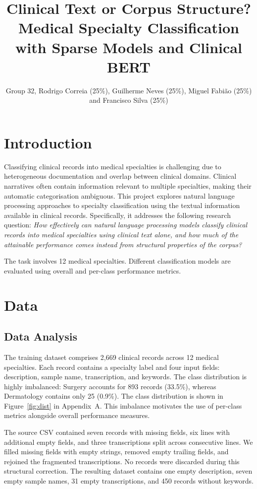 \documentclass[twocolumn,10pt]{article}
\title{Clinical Text or Corpus Structure? Medical Specialty Classification with Sparse Models and Clinical BERT}
\author{Group 32, Rodrigo Correia (25\%), Guilherme Neves (25\%), Miguel Fabião (25\%) and Francisco Silva (25\%)}
\date{}
\begin{document}
\maketitle

\raggedbottom

\section{Introduction}

\noindent
Classifying clinical records into medical specialties is challenging due to heterogeneous documentation and overlap between clinical domains. Clinical narratives often contain information relevant to multiple specialties, making their automatic categorisation ambiguous. This project explores natural language processing approaches to specialty classification using the textual information available in clinical records. Specifically, it addresses the following research question: \textit{How effectively can natural language processing models classify clinical records into medical specialties using clinical text alone, and how much of the attainable performance comes instead from structural properties of the corpus?}

\noindent 
The task involves 12 medical specialties. Different classification models are evaluated using overall and per-class performance metrics.

\section{Data}

\subsection{Data Analysis}

\noindent The training dataset comprises 2,669 clinical records across 12 medical specialties. Each record contains a specialty label and four input fields: description, sample name, transcription, and keywords. The class distribution is highly imbalanced: Surgery accounts for 893 records (33.5\%), whereas Dermatology contains only 25 (0.9\%). The class distribution is shown in Figure~\ref{fig:dist} in Appendix~A. This imbalance motivates the use of per-class metrics alongside overall performance measures.

\noindent The source CSV contained seven records with missing fields, six lines with additional empty fields, and three transcriptions split across consecutive lines. We filled missing fields with empty strings, removed empty trailing fields, and rejoined the fragmented transcriptions. No records were discarded during this structural correction. The resulting dataset contains one empty description, seven empty sample names, 31 empty transcriptions, and 450 records without keywords.
\end{document}
